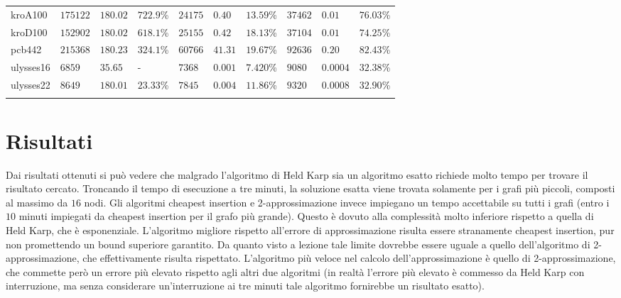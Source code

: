 \begin{tabularx}{\textwidth}{*{10}{Y}}
    kroA100 & $175122$ & $180.02$ & $722.9$\% & $24175$ & $0.40$ & $13.59$\% & $37462$ & $0.01$ & $76.03$\%\\
    kroD100 & $152902$ & $180.02$ & $618.1$\% & $25155$ & $0.42$ & $18.13$\% & $37104$ & $0.01$ & $74.25$\%\\
    pcb442 & $215368$ & $180.23$ & $324.1$\% & $60766$ & $41.31$ & $19.67$\% & $92636$ & $0.20$ & $82.43$\%\\
    ulysses16 & $6859$ & $35.65$ & - & $7368$ & $0.001$ & $7.420$\% & $9080$ & $0.0004$ & $32.38$\%\\
    ulysses22 & $8649$ & $180.01$ & $23.33$\% & $7845$ & $0.004$ & $11.86$\% & $9320$ & $0.0008$ & $32.90$\%\\
    \bottomrule
    \caption{Risultati}\label{tab:risultati}
\end{tabularx}

\normalsize

\clearpage

\section{Risultati\label{sec:risultati}}
Dai risultati ottenuti si può vedere che malgrado l'algoritmo di Held Karp sia un algoritmo esatto richiede molto tempo per trovare il risultato cercato. Troncando il tempo di esecuzione a tre minuti, la soluzione esatta viene trovata solamente per i grafi più piccoli, composti al massimo da $16$ nodi.
Gli algoritmi cheapest insertion e 2-approssimazione invece impiegano un tempo accettabile su tutti i grafi (entro i $10$ minuti impiegati da cheapest insertion per il grafo più grande). Questo è dovuto alla complessità molto inferiore rispetto a quella di Held Karp, che è esponenziale.
L'algoritmo migliore rispetto all'errore di approssimazione risulta essere stranamente cheapest insertion, pur non promettendo un bound superiore garantito.
Da quanto visto a lezione tale limite dovrebbe essere uguale a quello dell'algoritmo di 2-approssimazione, che effettivamente risulta rispettato.
L'algoritmo più veloce nel calcolo dell'approssimazione è quello di 2-approssimazione, che commette però un errore più elevato rispetto agli altri due algoritmi (in realtà l'errore più elevato è commesso da Held Karp con interruzione, ma senza considerare un'interruzione ai tre minuti tale algoritmo fornirebbe un risultato esatto).